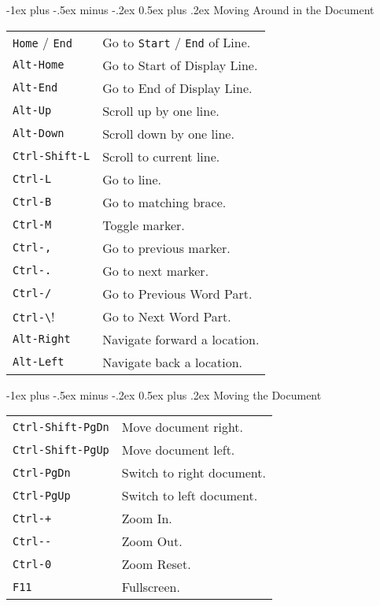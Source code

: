 \documentclass[12pt,landscape]{article}
\makeatletter
\renewcommand{\section}{\@startsection{section}{1}{0mm}%
                                {-1ex plus -.5ex minus -.2ex}%
                                {0.5ex plus .2ex}%
                                {\normalfont\large\bfseries}}
\makeatother
\begin{document}
\begin{multicols}{3}
\section{Moving Around in the Document}
\begin{tabular}{@{}ll@{}}
	\verb!Home! / \verb!End! & Go to  \verb!Start! / \verb!End! of Line. \\
	\verb!Alt-Home! & Go to Start of Display Line. \\
	\verb!Alt-End! & Go to End of Display Line. \\
	\verb!Alt-Up! & Scroll up by one line. \\
	\verb!Alt-Down! & Scroll down by one line. \\
	\verb!Ctrl-Shift-L! & Scroll to current line. \\
	\verb!Ctrl-L! & Go to line. \\
	\verb!Ctrl-B! & Go to matching brace. \\
	\verb!Ctrl-M! & Toggle marker. \\
	\verb!Ctrl-,! & Go to previous marker. \\
	\verb!Ctrl-.! & Go to next marker. \\
	\verb!Ctrl-/! & Go to Previous Word Part. \\
	\verb!Ctrl-\! & Go to Next Word Part. \\
	\verb!Alt-Right! & Navigate forward a location. \\
	\verb!Alt-Left! & Navigate back a location. \\
\end{tabular}

\section{Moving the Document}
\begin{tabular}{@{}ll@{}}
	\verb!Ctrl-Shift-PgDn! & Move document right. \\
	\verb!Ctrl-Shift-PgUp! & Move document left. \\
	\verb!Ctrl-PgDn! & Switch to right document. \\
	\verb!Ctrl-PgUp! & Switch to left document. \\
	\verb!Ctrl-+! & Zoom In. \\
	\verb!Ctrl--! & Zoom Out. \\
	\verb!Ctrl-0! & Zoom Reset. \\
	\verb!F11! & Fullscreen. \\
\end{tabular}


\end{multicols}
\end{document}
